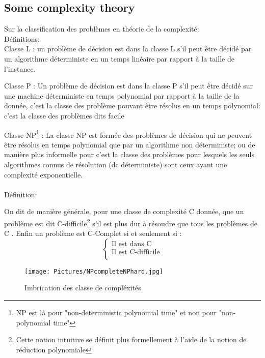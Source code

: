 
\subsection*{Some complexity theory}

Sur la classification des problèmes en théorie de la complexité:\\


Définitions:\\
Classe L : un problème de décision est dans la classe L s'il peut être décidé
par un algorithme déterministe en un temps linéaire par rapport à la taille de l'instance.

Classe P : Un problème de décision est dans la classe P s'il peut être décidé sur une machine
déterministe en temps polynomial par rapport à la taille de la donnée, c'est la classe des 
problème pouvant être résolus en un temps polynomial: c'est la classe des problèmes dits facile

Classe NP\footnote{ NP est là pour "non-deterministic polynomial time" et non pour "non-polynomial time"} : La classe NP est formée des problèmes de décision qui ne peuvent être résolus en temps polynomial  que par un algorithme non déterministe; ou de manière plus informelle pour  c'est la classe des problèmes pour lesquels les seuls algorithmes connus de résolution (dc déterministe) sont ceux ayant une complexité exponentielle.\\ 
\\Définition:

On dit de manière générale, pour une classe de complexité C donnée, que un problème est dit C-difficile\footnote{Cette notion intuitive se définit plus formellement à l'aide de la notion de réduction polynomiale} s'il est plus dur à résoudre que tous les problèmes de C . Enfin un problème est C-Complet si et seulement si :
\begin{displaymath}
	\left\{
		\begin{array}{ll}
			\textrm{Il est dans C}\\
			\textrm{Il est C-difficile}\\
		\end{array} 			
	\right.
\end{displaymath}


\begin{figure}[h!]
\centering
\texttt{[image: Pictures/NPcompleteNPhard.jpg]}
\caption{Imbrication des classe de compléxités }
\end{figure}

